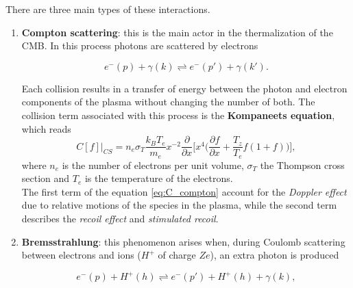There are three main types of these interactions.
\begin{enumerate}
    \item \textbf{Compton scattering}: this is the main actor in the thermalization of the CMB. In this process photons are scattered by electrons 
    \begin{multicols}{2}
        $$e^{-}(p)+\gamma(k)\rightleftharpoons e^{-}(p')+\gamma(k').$$\vspace{4cm}
        
    \end{multicols}
    Each collision results in a transfer of energy between the photon and electron components of the plasma without changing the number of both. The collision term associated with this process is the \textbf{Kompaneets equation}, which reads
    \begin{equation}
        C[f]\bigg|_{CS}=n_e\sigma_T\frac{k_BT_e}{m_e}x^{-2}\frac{\partial}{\partial x}\bigg[x^4\bigg(\frac{\partial f}{\partial x}+\frac{T_z}{T_e}f(1+f)\bigg)\bigg],\label{eq:C_compton}
    \end{equation}
    where $n_e$ is the number of electrons per unit volume, $\sigma_T$ the Thompson cross section and $T_e$ is the temperature of the electrons. \\
    The first term of the equation \eqref{eq:C_compton} account for the \emph{Doppler effect} due to relative motions of the species in the plasma, while the second term describes the \emph{recoil effect} and \emph{stimulated recoil}.
    \item \textbf{Bremsstrahlung}: this phenomenon arises when, during Coulomb scattering between electrons and ions ($H^+$ of charge $Ze$), an extra photon is produced
    \begin{multicols}{2}
        $$e^{-}(p)+H^+(h)\rightleftharpoons e^{-}(p')+H^+(h)+\gamma(k),$$\vspace{4cm}\\
\end{multicols}
\end{enumerate}
